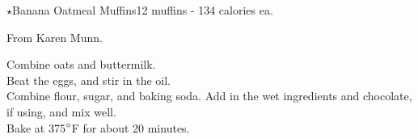 \begin{recipe}{\texorpdfstring{$\star$}{str}Banana Oatmeal Muffins}{12 muffins - 134 calories ea.}{}

\freeform From Karen Munn.


Combine oats and buttermilk.\\

Beat the eggs, and stir in the oil.\\

Combine flour, sugar, and baking soda. Add in the wet ingredients and chocolate, if using, and mix well.\\

Bake at 375$\degree$F for about 20 minutes.

\end{recipe}